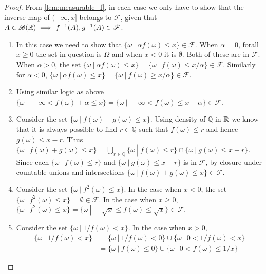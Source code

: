 \begin{proof}
  From \cref{lem:measurable_f}, in each case we only have to show that the inverse map of $(-\infty,x]$ belongs to $ \mathscr{F}$, given that $A\in \mathscr{B}( \mathbb{R})\implies f^{-1}(A),g^{-1}(A)\in \mathscr{F}$. 
  \begin{enumerate}
    \item In this case we need to show that $\{\omega\ |\ \alpha f(\omega)\leq x\}\in \mathscr{F}$. When $\alpha = 0$, forall $x\geq 0$ the set in question is $\Omega$ and when $x<0$ it is $\emptyset$. Both of these are in $ \mathscr{F}$. When $\alpha>0$, the set $\{\omega\ |\ \alpha f(\omega) \leq x\} = \{\omega\ |\ f(\omega)\leq x/\alpha\} \in \mathscr{F}$. Similarly for $\alpha < 0$, $\{\omega\ |\ \alpha f(\omega)\leq x\} = \{\omega\ |\ f(\omega)\geq x/\alpha\}\in \mathscr{F}$.\\
    \item Using similar logic as above $\{\omega\ |\ -\infty <f(\omega) +\alpha \leq x\} =\{\omega\ |\ -\infty <f(\omega) \leq x-\alpha \} \in \mathscr{F}$. \\
    \item Consider the set $\{\omega\ |\ f(\omega)+g(\omega) \leq x\}$. Using density of $ \mathbb{Q}$ in $\mathbb{R}$ we know that it is always possible to find $r\in \mathbb{Q}$ such that $f(\omega)\leq r$ and hence $g(\omega)\leq x-r $. Thus $\{\omega\ |\ f(\omega)+g(\omega) \leq x\} = \bigcup_{r\in \mathbb{Q}}\{\omega\ |\ f(\omega) \leq r\}\cap \{\omega\ |\ g(\omega) \leq x-r\} $. Since each $\{\omega\ |\ f(\omega) \leq r\}$ and $\{\omega\ |\ g(\omega) \leq x-r\}$ is in $ \mathscr{F}$, by closure under countable unions and intersections $\{\omega\ |\ f(\omega)+g(\omega) \leq x\}\in \mathscr{F}$.\\
    \item Consider the set $\{\omega\ |\ f^2(\omega) \leq x\}$. In the case when $x<0$, the set $\{\omega\ |\ f^2(\omega) \leq x\} = \emptyset\in \mathscr{F}$. In the case when $x\geq0$, $\{\omega\ |\ f^2(\omega) \leq x\} = \{\omega\ |\ -\sqrt{x} \leq f(\omega) \leq \sqrt{x}\}\in \mathscr{F}.$\\   
    \item Consider the set $\{\omega\ |\ 1/f(\omega) < x\}$. In the case when $x>0$, 
      \begin{align*}
        \{\omega\ |\ 1/f(\omega) < x\} &= \{\omega\ |\ 1/f(\omega) < 0\}\cup \{\omega\ |\ 0<1/f(\omega) < x\}\\ &= \{\omega\ |\ f(\omega) \leq 0\}\cup \{\omega\ |\ 0<f(\omega) \leq 1/x\}

\end{align*}
\end{enumerate}
\end{proof}
